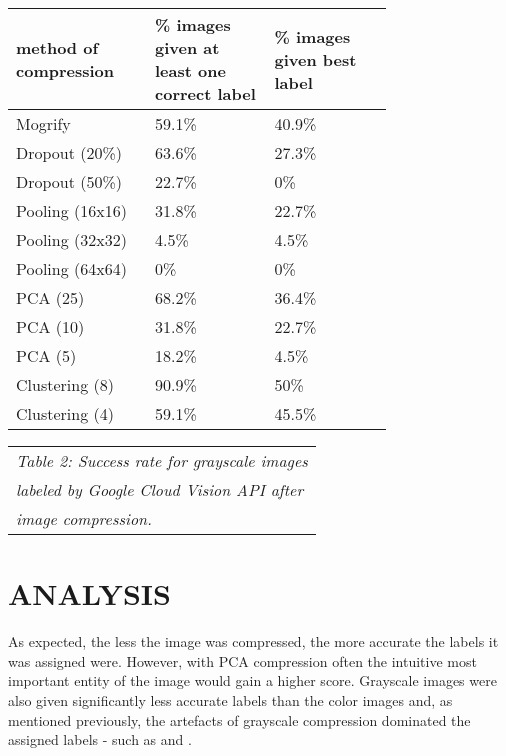 \documentclass[letterpaper, 12 pt, conference]{ieeeconf}  %
\begin{document}
\bgroup
\def\arraystretch{1.2} %
\begin{tabular}{|p{0.25\linewidth}|p{0.25\linewidth}|p{0.25\linewidth}|}
\hline
{\bf method of compression} & {\bf \% images given at least one correct label}
	& {\bf \% images given best label} \\
\hline
Mogrify & 59.1\% & 40.9\% \\ %
\hline
Dropout (20\%) & 63.6\% & 27.3\% \\ %
\hline
Dropout (50\%) & 22.7\% & 0\% \\ %
\hline
Pooling (16x16) & 31.8\% & 22.7\% \\ %
\hline
Pooling (32x32) & 4.5\% & 4.5\%\\ %
\hline
Pooling (64x64) & 0\% & 0\% \\ %
\hline
PCA (25) & 68.2\% & 36.4\% \\ %
\hline
PCA (10) & 31.8\% & 22.7\% \\ %
\hline
PCA (5) & 18.2\% & 4.5\% \\ %
\hline
Clustering (8) & 90.9\% & 50\% \\ %
\hline
Clustering (4) & 59.1\% & 45.5\% \\ %
\hline
\end{tabular}
\egroup

\vspace*{2mm}
\begin{tabular}{l}
{\it Table 2: Success rate for grayscale images} \\
{\it labeled by Google Cloud Vision API after} \\
{\it image compression.} \\
\end{tabular}

\def\arraystretch{1.0} %

\vspace*{4mm}

\section{ANALYSIS}

As expected, the less the image was compressed, the more accurate
the labels it was assigned were. However, with PCA compression often the intuitive most important entity of the image would gain a higher score. Grayscale images were also given significantly less accurate labels than the color images and, as mentioned previously, the artefacts of grayscale compression dominated the assigned labels - such as  and .
\end{document}
